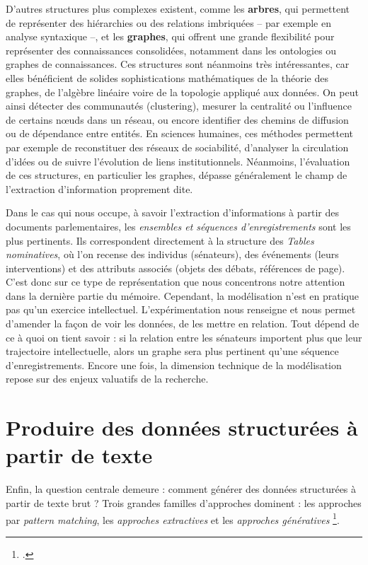 D’autres structures plus complexes existent, comme les \textbf{arbres}, qui permettent de représenter des hiérarchies ou des relations imbriquées -- par exemple en analyse syntaxique --, et les \textbf{graphes}, qui offrent une grande flexibilité pour représenter des connaissances consolidées, notamment dans les ontologies ou graphes de connaissances. Ces structures sont néanmoins très intéressantes, car elles bénéficient de solides sophistications mathématiques de la théorie des graphes, de l'algèbre linéaire voire de la topologie appliqué aux données. On peut ainsi détecter des communautés (clustering), mesurer la centralité ou l’influence de certains nœuds dans un réseau, ou encore identifier des chemins de diffusion ou de dépendance entre entités. En sciences humaines, ces méthodes permettent par exemple de reconstituer des réseaux de sociabilité, d’analyser la circulation d’idées ou de suivre l’évolution de liens institutionnels. Néanmoins, l’évaluation de ces structures, en particulier les graphes, dépasse généralement le champ de l’extraction d’information proprement dite.

Dans le cas qui nous occupe, à savoir l’extraction d’informations à partir des documents parlementaires, les \emph{ensembles et séquences d’enregistrements} sont les plus pertinents. Ils correspondent directement à la structure des \emph{Tables nominatives}, où l’on recense des individus (sénateurs), des événements (leurs interventions) et des attributs associés (objets des débats, références de page). C’est donc sur ce type de représentation que nous concentrons notre attention dans la dernière partie du mémoire. Cependant, la modélisation n'est en pratique pas qu'un exercice intellectuel. L'expérimentation nous renseigne et nous permet d'amender la façon de voir les données, de les mettre en relation. Tout dépend de ce à quoi on tient savoir : si la relation entre les sénateurs importent plus que leur trajectoire intellectuelle, alors un graphe sera plus pertinent qu'une séquence d'enregistrements. Encore une fois, la dimension technique de la modélisation repose sur des enjeux valuatifs de la recherche.

\section{Produire des données structurées à partir de texte}

Enfin, la question centrale demeure : comment générer des données structurées à partir de texte brut ? Trois grandes familles d’approches dominent : les approches par \emph{pattern matching}, les \emph{approches extractives} et les \emph{approches génératives} \footcite[][]{graham}.


